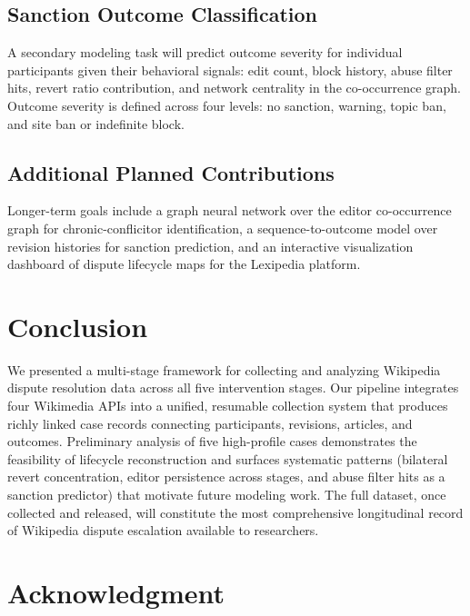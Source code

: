 \documentclass[conference]{IEEEtran}
\begin{document}
\subsection{Sanction Outcome Classification}

A secondary modeling task will predict outcome severity for individual
participants given their behavioral signals: edit count, block history, abuse
filter hits, revert ratio contribution, and network centrality in the
co-occurrence graph. Outcome severity is defined across four levels: no
sanction, warning, topic ban, and site ban or indefinite block.

\subsection{Additional Planned Contributions}

Longer-term goals include a graph neural network over the editor co-occurrence
graph for chronic-conflicitor identification, a sequence-to-outcome model over
revision histories for sanction prediction, and an interactive visualization
dashboard of dispute lifecycle maps for the Lexipedia platform.

\section{Conclusion}

We presented a multi-stage framework for collecting and analyzing Wikipedia
dispute resolution data across all five intervention stages. Our pipeline
integrates four Wikimedia APIs into a unified, resumable collection system
that produces richly linked case records connecting participants, revisions,
articles, and outcomes. Preliminary analysis of five high-profile cases
demonstrates the feasibility of lifecycle reconstruction and surfaces systematic
patterns (bilateral revert concentration, editor persistence across stages,
and abuse filter hits as a sanction predictor) that motivate future modeling
work. The full dataset, once collected and released, will constitute the most
comprehensive longitudinal record of Wikipedia dispute escalation available to
researchers.

\section*{Acknowledgment}
\end{document}
